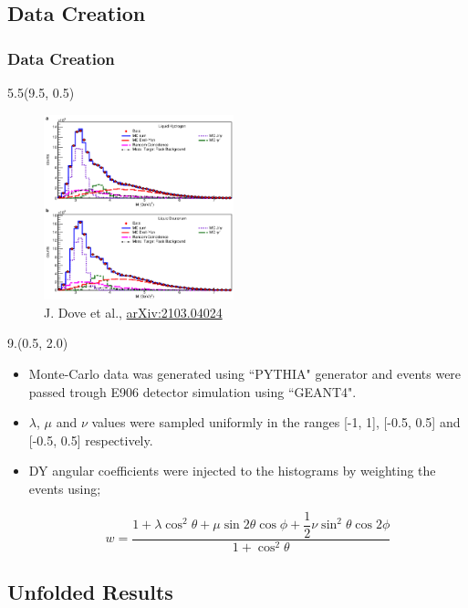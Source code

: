 \documentclass[12pt, xcolor={dvipsnames}, aspectratio = 169, sans, mathserif]{beamer}
\newenvironment{List}[2]
{\begin{textblock}{#1}#2
\begin{itemize}}
{\end{itemize}
\end{textblock}}
\newenvironment{Pic}[2]
{\begin{textblock}{#1}#2
\begin{figure}}
{\end{figure}
\end{textblock}}
\newcommand{\NewCaption}[3]{\caption{{#1}, \textcolor{blue}{\href{#2}{#3}}}}
\begin{document}
\subsection{Data Creation}
\begin{frame}
\frametitle{Data Creation}

\begin{Pic}{5.5}{(9.5, 0.5)}
  \NewCaption{J. Dove et al.}{https://arxiv.org/abs/2103.04024}{arXiv:2103.04024}
  \includegraphics[width=5.5cm]{imgs/mc2real.png}
\end{Pic}

\begin{List}{9.}{(0.5, 2.0)}

  \item Monte-Carlo data was generated using ``PYTHIA" generator and events were passed trough E906 detector simulation using ``GEANT4".

  \item $\lambda$, $\mu$ and $\nu$ values were sampled uniformly in the ranges [-1, 1], [-0.5, 0.5] and [-0.5, 0.5] respectively.

  \item DY angular coefficients were injected to the histograms by weighting the events using;

  \begin{equation*}
w = \frac{1  + \lambda \cos^{2}\theta + \mu \sin 2 \theta \cos \phi + \dfrac{1}{2}\nu \sin^{2}\theta \cos 2 \phi}{1 + \cos^{2}\theta}
  \end{equation*}

\end{List}
\end{frame}

\subsection{Unfolded Results}

%
%
%
\end{document}
